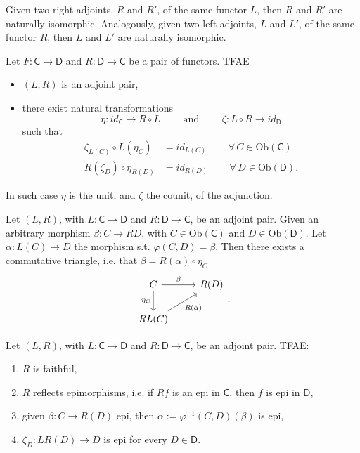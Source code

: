 \begin{prop}
	Given two right adjoints, $R$ and $R'$, of the same functor $L$,
	then $R$ and $R'$ are naturally isomorphic.
	Analogously, given two left adjoints, $L$ and $L'$, of the same functor $R$,
	then $L$ and $L'$ are naturally isomorphic.
\end{prop} 

\begin{prop}
	Let $F: \mathsf{C} \to \mathsf{D}$ and $R: \mathsf{D} \to \mathsf{C}$ be a pair of functors.
	TFAE
	\begin{itemize}
		\item $\left(L, R\right)$ is an adjoint pair,
		\item there exist natural transformations
			\begin{equation}
			\eta: id_{\mathsf{C}} \to R \circ L \qquad \text{ and }\qquad \zeta: L \circ R \to id_{\mathsf{D}}
			\end{equation} 
			such that
			\begin{align}
				\zeta_{L(C)} \circ L(\eta_C) &= id_{L(C)} \qquad
				\,\forall\, C \in \mathrm{Ob} \left(\mathsf{C}\right)\\
				R(\zeta_D) \circ \eta_{R(D)} &= id_{R(D)} \qquad
				\,\forall\, D \in \mathrm{Ob} \left(\mathsf{D}\right)
			.\end{align} 
	\end{itemize}
	In such case $\eta$ is the unit, and $\zeta$ the counit, of the adjunction.
\end{prop} 

\begin{rem}
	Let $\left(L, R\right)$, with $L: \mathsf{C} \to \mathsf{D}$ and $R: \mathsf{D} \to \mathsf{C}$, be an adjoint pair.
	Given an arbitrary morphism $\beta: C \to RD$, with $C \in \mathrm{Ob} \left(\mathsf{C}\right)$ and
	$D \in \mathrm{Ob} \left(\mathsf{D}\right)$.
	Let $\alpha: L(C) \to D$ the morphism s.t. $\varphi(C,D) = \beta$.
	Then there exists a commutative triangle, i.e. that $\beta = R(\alpha) \circ\eta_C$
	\begin{equation}
	\begin{tikzcd}
		C \arrow[r, "\beta", rightarrow] \arrow[d, "\eta_C"', rightarrow] &
		R(D)\\
		RL(C) \arrow[ru, "{R(\alpha)}"', rightarrow] &
	\end{tikzcd}
	.\end{equation} 
\end{rem} 

\begin{rem}[]
	Let $\left(L, R\right)$, with $L: \mathsf{C} \to \mathsf{D}$ and $R: \mathsf{D} \to \mathsf{C}$, be an adjoint pair.
	TFAE:
	\begin{enumerate}
		\item $R$ is faithful,
		\item $R$ reflects epimorphisms, i.e. if $Rf$ is an epi in $\mathsf{C}$,
			then $f$ is epi in $\mathsf{D}$,
		\item given $\beta: C \to R(D)$ epi, then $\alpha := \varphi^{-1}(C,D)(\beta)$ is epi,
		\item $\zeta_D: LR(D) \to D$ is epi for every $D \in \mathsf{D}$.
	\end{enumerate}
\end{rem}

